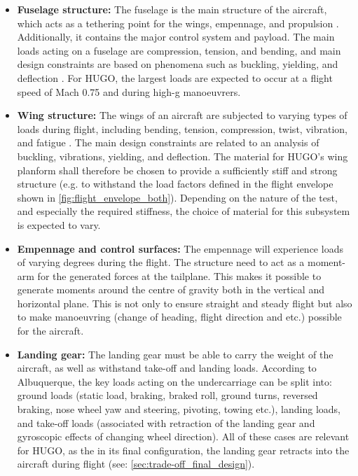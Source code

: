  
\begin{itemize}
    \item \textbf{Fuselage structure:}
    The fuselage is the main structure of the aircraft, which acts as a tethering point for the wings, empennage, and propulsion \cite{CHATTERJEE2019199}. Additionally, it contains the major control system and payload. The main loads acting on a fuselage are compression, tension, and bending, and main design constraints are based on phenomena such as buckling, yielding, and deflection \cite{Arnold2012MaterialsSelection}. For HUGO, the largest loads are expected to occur at a flight speed of Mach 0.75 and during high-g manoeuvrers. 
    
    \item \textbf{Wing structure:} The wings of an aircraft are subjected to varying types of loads during flight, including bending, tension, compression, twist, vibration, and fatigue \cite{Arnold2012MaterialsSelection}. The main design constraints are related to an analysis of buckling, vibrations, yielding, and deflection. The material for HUGO's wing planform shall therefore be chosen to provide a sufficiently stiff and strong structure (e.g. to withstand the load factors defined in the flight envelope shown in \autoref{fig:flight_envelope_both}). Depending on the nature of the test, and especially the required stiffness, the choice of material for this subsystem is expected to vary.

    \item \textbf{Empennage and control surfaces:} The empennage will experience loads of varying degrees during the flight. The structure need to act as a moment-arm for the generated forces at the tailplane. This makes it possible to generate moments around the centre of gravity both in the vertical and horizontal plane. This is not only to ensure straight and steady flight but also to make manoeuvring (change of heading, flight direction and etc.) possible for the aircraft.   

    
    \item \textbf{Landing gear:} 
    The landing gear must be able to carry the weight of the aircraft, as well as withstand take-off and landing loads. According to Albuquerque\cite{structural_loads_handbook}, the key loads acting on the undercarriage can be split into: ground loads (static load, braking, braked roll, ground turns, reversed braking, nose wheel yaw and steering, pivoting, towing etc.), landing loads, and take-off loads (associated with retraction of the landing gear and gyroscopic effects of changing wheel direction). All of these cases are relevant for HUGO, as the in its final configuration, the landing gear retracts into the aircraft during flight (see: \autoref{sec:trade-off_final_design}).  


\end{itemize}
